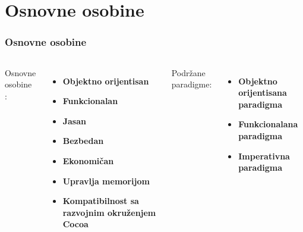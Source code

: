 \documentclass{beamer}
\begin{document}
\section{Osnovne osobine}
\begin{frame}
\frametitle{Osnovne osobine}
\begin{columns}[t] %

Osnovne osobine \cite{swift_programming} :
\begin{itemize}
\item{\textbf{Objektno orijentisan}}
\item{\textbf{Funkcionalan}}
\item{\textbf{Jasan}}
\item{\textbf{Bezbedan}}
\item{\textbf{Ekonomičan}}
\item{\textbf{Upravlja memorijom}}
\item{\textbf{Kompatibilnost sa razvojnim okruženjem Cocoa}}
\end{itemize}

Podržane paradigme:
\begin{itemize}
\item{\textbf{Objektno orijentisana paradigma}}
\item{\textbf{Funkcionalana paradigma}}
\item{\textbf{Imperativna paradigma}}
\end{itemize}

\end{columns}
\end{frame}
\end{document}
